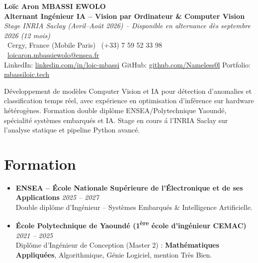 \documentclass[a4paper,11pt]{article}
\begin{document}
\begin{center}
    {\Large \textbf{Lo\"ic Aron MBASSI EWOLO}} \\ \vspace{4pt}
    \textbf{\large Alternant Ing\'enieur IA -- Vision par Ordinateur \& Computer Vision} \\
    \textit{\small Stage INRIA Saclay (Avril--Ao\^ut 2026) -- Disponible en alternance d\`es septembre 2026 (12 mois)} \\ \vspace{4pt}
    \small
    \Pointinghand\ Cergy, France (Mobile Paris) \quad \Mobilefone\ (+33) 7 59 52 33 98 \quad
    {\color{primary}\Letter\ \href{mailto:loicaron.mbassiewolo@ensea.fr}{loicaron.mbassiewolo@ensea.fr}} \\ \vspace{2pt}
    {\color{primary}LinkedIn: \href{https://www.linkedin.com/in/loic-mbassi/}{linkedin.com/in/loic-mbassi}} \quad
    {\color{primary}GitHub: \href{https://github.com/Nameless0l}{github.com/Nameless0l}} \quad
    {\color{primary}Portfolio: \href{https://mbassiloic.tech}{mbassiloic.tech}}
\end{center}
\vspace{-6pt}
\noindent\small{D\'eveloppement de mod\`eles Computer Vision et IA pour d\'etection d'anomalies et classification temps r\'eel, avec exp\'erience en optimisation d'inf\'erence sur hardware h\'et\'erog\`enes. Formation double dipl\^ome ENSEA/Polytechnique Yaound\'e, sp\'ecialit\'e syst\`emes embarqu\'es et IA. Stage en cours \'a l'INRIA Saclay sur l'analyse statique et pipeline Python avanc\'e.}

\section{Formation}
\begin{itemize}[leftmargin=*, label=\tiny$\bullet$, nosep]
    \item \textbf{ENSEA -- \'Ecole Nationale Sup\'erieure de l'\'Electronique et de ses Applications} \hfill \textit{2025 -- 2027} \\
    \small{Double dipl\^ome d'Ing\'enieur -- Syst\`emes Embarqu\'es \& Intelligence Artificielle.}
    \item \textbf{\'Ecole Polytechnique de Yaound\'e (1\textsuperscript{\`ere} \'ecole d'ing\'enieur CEMAC)} \hfill \textit{2021 -- 2025} \\
    \small{Dipl\^ome d'Ing\'enieur de Conception (Master 2) : \textbf{Math\'ematiques Appliqu\'ees}, Algorithmique, G\'enie Logiciel, mention Tr\`es Bien.}
\end{itemize}
\end{document}
